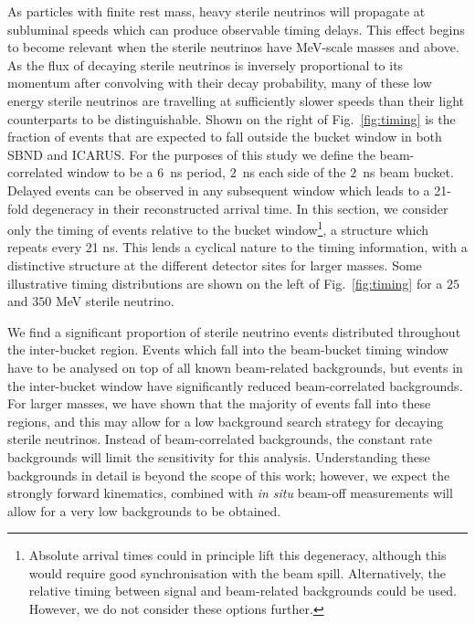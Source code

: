\documentclass[11pt, a4paper]{article}
\newcommand{\reffig}[1]{Fig.~\ref{#1}}
\def\muboone{MicroBooNE}
\begin{document}
As particles with finite rest mass, heavy sterile neutrinos will propagate at
subluminal speeds which can produce observable timing delays.  This effect
begins to become relevant when the sterile neutrinos have MeV-scale masses and
above. As the flux of decaying sterile neutrinos is inversely proportional to
its momentum after convolving with their decay probability, many of these low
energy sterile neutrinos are travelling at sufficiently slower speeds than their light
counterparts to be distinguishable. Shown on the right of \reffig{fig:timing}
is the fraction of events that are expected to fall outside the  bucket window
in both SBND and ICARUS. For the purposes of this study we define the
beam-correlated window to be a $6$~ns period, $2$~ns each side of the $2$~ns
beam bucket.
%
Delayed events can be observed in any subsequent window which leads to a
21-fold degeneracy in their reconstructed arrival time. In this
section, we consider only the timing of events relative to the
bucket window\footnote{Absolute
arrival times could in principle lift this degeneracy, although this would
require good synchronisation with the beam spill. Alternatively, the relative
timing between signal and beam-related backgrounds could be used. However, we
do not consider these options further.}, a structure which repeats every 21 ns. This lends a cyclical nature to the
timing information, with a distinctive structure at the different detector
sites for larger masses. Some illustrative timing distributions are shown on
the left of \reffig{fig:timing} for a $25$ and $350$ MeV sterile neutrino.
%

We find a significant proportion of sterile neutrino events distributed throughout the
inter-bucket region. Events which fall into the beam-bucket timing window have
to be analysed on top of all known beam-related backgrounds, but events in the
inter-bucket window have significantly reduced beam-correlated backgrounds. 
%
For larger masses, we have shown that the majority of events fall into these
regions, and this may allow for a low background search strategy for decaying
sterile neutrinos. Instead of beam-correlated backgrounds, the constant rate backgrounds
will limit the sensitivity for this analysis. Understanding these backgrounds
in detail is beyond the scope of this work; however, we expect the strongly
forward kinematics, combined with \emph{in situ} beam-off measurements will allow
for a very low backgrounds to be obtained.

\end{document}

